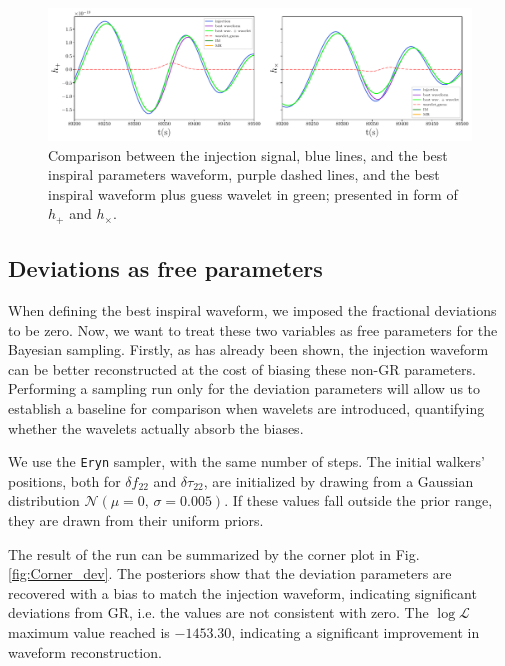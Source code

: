 \begin{figure}[h!]
    \centering
    \includegraphics[width=1\textwidth]{Images/Guess.pdf}
    \caption{Comparison between the injection signal, blue lines, and the best inspiral parameters waveform, purple dashed lines, and the best inspiral waveform plus guess wavelet in green; presented in form of $h_{+}$ and $h_{\times}$.  }
    \label{fig:Guess}
\end{figure}




\subsection{Deviations as free parameters}

When defining the best inspiral waveform, we imposed the fractional deviations to be zero. Now, we want to treat these two variables as free parameters for the Bayesian sampling. Firstly, as has already been shown, the injection waveform can be better reconstructed at the cost of biasing these non-GR parameters. Performing a sampling run only for the deviation parameters will allow us to establish a baseline for comparison when wavelets are introduced, quantifying whether the wavelets actually absorb the biases. 

We use the \texttt{Eryn} sampler, with the same number of steps. The initial walkers' positions, both for $\delta f_{22}$ and $\delta \tau_{22}$, are initialized by drawing from a Gaussian distribution $\mathcal{N}(\mu = 0,\, \sigma = 0.005)$. If these values fall outside the prior range, they are drawn from their uniform priors. 

The result of the run can be summarized by the corner plot in Fig. \ref{fig:Corner_dev}. The posteriors show that the deviation parameters are recovered with a bias to match the injection waveform, indicating significant deviations from GR, i.e. the values are not consistent with zero. The $\log \mathcal{L}$ maximum value reached is $-1453.30$, indicating a significant improvement in waveform reconstruction.

